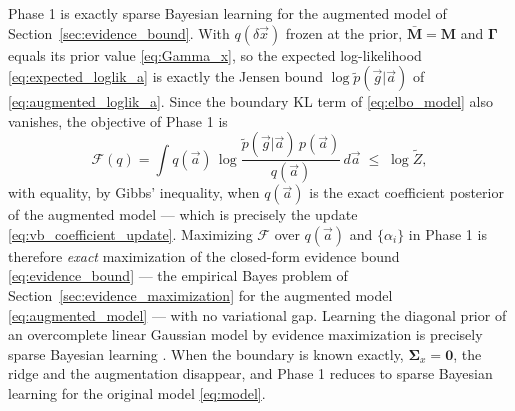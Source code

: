 \documentclass{article}
\begin{document}
Phase 1 is exactly sparse Bayesian learning for the augmented model of Section~\ref{sec:evidence_bound}. With $q(\delta\vec x)$ frozen at the prior, $\bar{\mathbf M} = \mathbf M$ and $\mathbf\Gamma$ equals its prior value \eqref{eq:Gamma_x}, so the expected log-likelihood \eqref{eq:expected_loglik_a} is exactly the Jensen bound $\log\tilde p(\vec g|\vec a)$ of \eqref{eq:augmented_loglik_a}. Since the boundary KL term of \eqref{eq:elbo_model} also vanishes, the objective of Phase 1 is
\begin{equation}
    \mathcal F(q) = \int q(\vec a)\,\log\frac{\tilde p(\vec g|\vec a)\,p(\vec a)}{q(\vec a)}\,d\vec a \;\le\; \log\tilde Z, \label{eq:phase1_objective}
\end{equation}
with equality, by Gibbs' inequality, when $q(\vec a)$ is the exact coefficient posterior of the augmented model --- which is precisely the update \eqref{eq:vb_coefficient_update}. Maximizing $\mathcal F$ over $q(\vec a)$ and $\{\alpha_i\}$ in Phase 1 is therefore \emph{exact} maximization of the closed-form evidence bound \eqref{eq:evidence_bound} --- the empirical Bayes problem of Section~\ref{sec:evidence_maximization} for the augmented model \eqref{eq:augmented_model} --- with no variational gap. Learning the diagonal prior of an overcomplete linear Gaussian model by evidence maximization is precisely sparse Bayesian learning \cite{tipping2001sparse}. When the boundary is known exactly, $\mathbf{\Sigma}_x = \mathbf 0$, the ridge and the augmentation disappear, and Phase 1 reduces to sparse Bayesian learning for the original model \eqref{eq:model}.
\end{document}
